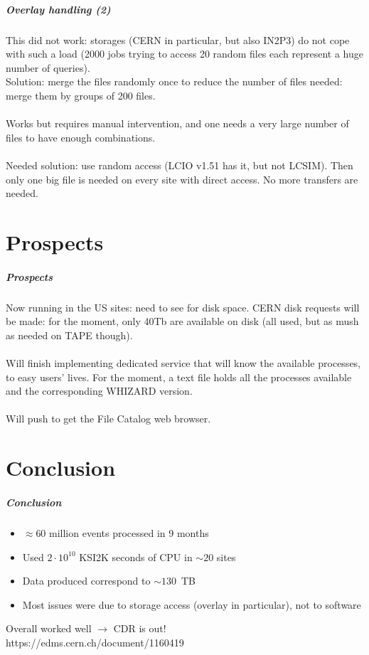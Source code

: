 \documentclass{beamer}
\begin{document}
\begin{frame}
\frametitle{Overlay handling (2)}
This did not work: storages (CERN in particular, but also IN2P3) do not cope with such a load (2000 jobs trying to access 20 random files each represent a huge number of queries).\\
Solution: \alert{merge the files randomly once} to reduce the number of files needed: merge them by groups of 200 files.\\ 
~\\
Works but requires manual intervention, and one needs a \alert{very large number of files} to have enough combinations.\\
~\\
Needed solution: \alert{use random access} (LCIO v1.51 has it, but not LCSIM). Then only one big file is needed on every site with direct access. No more transfers are needed.
\end{frame}


\part{Prospects}
\begin{frame}
\partpage 
\end{frame}

\begin{frame}
\frametitle{Prospects} 
Now running in the US sites: need to see for disk space. CERN disk requests will be made: for the moment, only 40Tb are available on disk (all used, but as mush as needed on TAPE though).\\
~\\
Will finish implementing dedicated service that will know the available processes, to easy users' lives. For the moment, a text file holds all the processes available and the corresponding WHIZARD version.\\
~\\
Will push to get the File Catalog web browser.
\end{frame}

\part{Conclusion}
\begin{frame}
\partpage 
\end{frame}

\begin{frame}
\frametitle{Conclusion} 
\begin{itemize}
\item $\approx 60$ million events processed in 9 months
\item Used $2\cdot 10^{10}$ KSI2K seconds of CPU in $\sim 20$ sites
\item Data produced correspond to $\sim 130$~TB
\item Most issues were due to storage access (overlay in particular), not to software
\end{itemize}
Overall worked well $\rightarrow$ \alert{CDR is out!}\\
https://edms.cern.ch/document/1160419
\end{frame}
\end{document}
